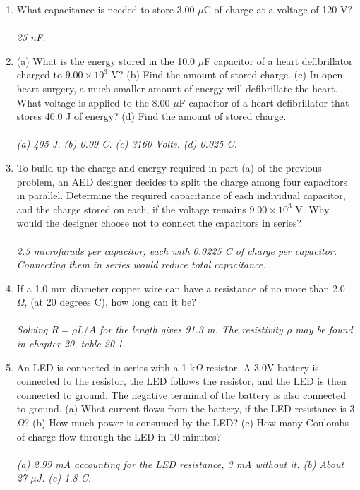 \documentclass[12pt,twocolumn]{article}
\begin{document}
\noindent
\begin{enumerate}
\item What capacitance is needed to store 3.00 $\mu$C of charge at a voltage of 120 V? \\ \\ \textit{25 nF.}
\item (a) What is the energy stored in the 10.0 $\mu$F capacitor of a heart defibrillator charged to $9.00\times 10^3$ V? (b) Find the amount of stored charge. (c) In open heart surgery, a much smaller amount of energy will defibrillate the heart.  What voltage is applied to the 8.00 $\mu$F capacitor of a heart defibrillator that stores 40.0 J of energy? (d) Find the amount of stored charge. \\ \\
\textit{(a) 405 J. (b) 0.09 C. (c) 3160 Volts.  (d) 0.025 C.}
\item To build up the charge and energy required in part (a) of the previous problem, an AED designer decides to split the charge among four capacitors in parallel.  Determine the required capacitance of each individual capacitor, and the charge stored on each, if the voltage remains $9.00 \times 10^3$ V.  Why would the designer choose not to connect the capacitors in series? \\ \\
\textit{2.5 microfarads per capacitor, each with 0.0225 C of charge per capacitor.  Connecting them in series would reduce total capacitance.}
\item If a 1.0 mm diameter copper wire can have a resistance of no more than 2.0 $\Omega$, (at 20 degrees C), how long can it be? \\ \\
\textit{Solving $R = \rho L/A$ for the length gives 91.3 m.  The resistivity $\rho$ may be found in chapter 20, table 20.1.}
\item An LED is connected in series with a 1 k$\Omega$ resistor.  A 3.0V battery is connected to the resistor, the LED follows the resistor, and the LED is then connected to ground.  The negative terminal of the battery is also connected to ground.  (a) What current flows from the battery, if the LED resistance is $3$ $\Omega$? (b) How much power is consumed by the LED? (c) How many Coulombs of charge flow through the LED in 10 minutes? \\ \\
\textit{(a) 2.99 mA accounting for the LED resistance, 3 mA without it. (b) About 27 $\mu$J.  (c) 1.8 C.}
\end{enumerate}
\end{document}

